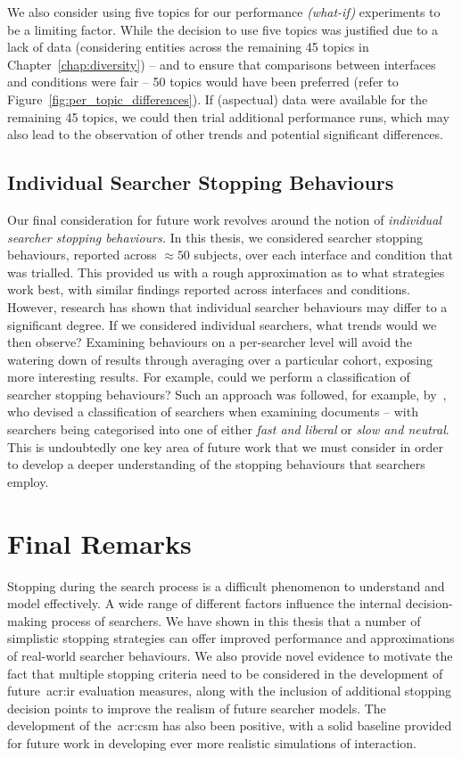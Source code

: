 We also consider using five topics for our performance \emph{(what-if)} experiments to be a limiting factor. While the decision to use five topics was justified due to a lack of data (considering entities across the remaining 45 topics in Chapter~\ref{chap:diversity}) -- and to ensure that comparisons between interfaces and conditions were fair -- 50 topics would have been preferred (refer to Figure~\ref{fig:per_topic_differences}). If (aspectual) data were available for the remaining 45 topics, we could then trial additional performance runs, which may also lead to the observation of other trends and potential significant differences.

\subsection{Individual Searcher Stopping Behaviours}
Our final consideration for future work revolves around the notion of \emph{individual searcher stopping behaviours.} In this thesis, we considered searcher stopping behaviours, reported across $\approx50$ subjects, over each interface and condition that was trialled. This provided us with a rough approximation as to what strategies work best, with similar findings reported across interfaces and conditions. However, research has shown that individual searcher behaviours may differ to a significant degree. If we considered individual searchers, what trends would we then observe? Examining behaviours on a per-searcher level will avoid the watering down of results through averaging over a particular cohort, exposing more interesting results. For example, could we perform a classification of searcher stopping behaviours? Such an approach was followed, for example, by~\cite{smucker2011user_strategies}, who devised a classification of searchers when examining documents -- with searchers being categorised into one of either \emph{fast and liberal} or \emph{slow and neutral}. This is undoubtedly one key area of future work that we must consider in order to develop a deeper understanding of the stopping behaviours that searchers employ.

\section{Final Remarks}\label{sec:conclusions:remarks}
Stopping during the search process is a difficult phenomenon to understand and model effectively. A wide range of different factors influence the internal decision-making process of searchers. We have shown in this thesis that a number of simplistic stopping strategies can offer improved performance and approximations of real-world searcher behaviours. We also provide novel evidence to motivate the fact that multiple stopping criteria need to be considered in the development of future~\gls{acr:ir} evaluation measures, along with the inclusion of additional stopping decision points to improve the realism of future searcher models. The development of the~\gls{acr:csm} has also been positive, with a solid baseline provided for future work in developing ever more realistic simulations of interaction.

